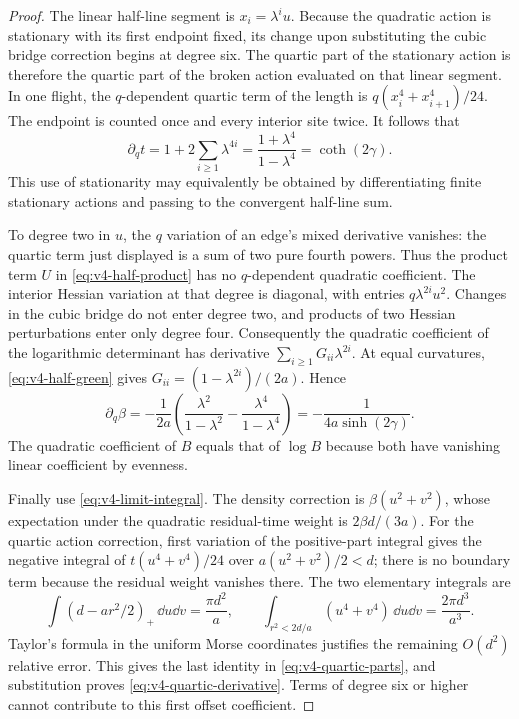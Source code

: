 \begin{proof}
The linear half-line segment is $x_i=\lambda^i u$. Because the
quadratic action is stationary with its first endpoint fixed, its
change upon substituting the cubic bridge correction begins at degree
six. The quartic part of the stationary action is therefore the
quartic part of the broken action evaluated on that linear segment.
In one flight, the $q$-dependent quartic term of the length is
$q(x_i^4+x_{i+1}^4)/24$. The endpoint is counted once and every
interior site twice. It follows that
\[
 \partial_qt=1+2\sum_{i\ge1}\lambda^{4i}
                  =\frac{1+\lambda^4}{1-\lambda^4}=\coth(2\gamma).
\]
This use of stationarity may equivalently be obtained by differentiating
finite stationary actions and passing to the convergent half-line sum.

To degree two in $u$, the $q$ variation of an edge's mixed derivative
vanishes: the quartic term just displayed is a sum of two pure fourth
powers. Thus the product term $U$ in \eqref{eq:v4-half-product} has
no $q$-dependent quadratic coefficient. The interior Hessian variation
at that degree is diagonal, with entries $q\lambda^{2i}u^2$.
Changes in the cubic bridge do not enter degree two, and products of
two Hessian perturbations enter only degree four. Consequently the
quadratic coefficient of the logarithmic determinant has derivative
$\sum_{i\ge1}G_{ii}\lambda^{2i}$. At equal curvatures,
\eqref{eq:v4-half-green} gives
$G_{ii}=(1-\lambda^{2i})/(2a)$. Hence
\[
 \partial_q\beta=-\frac1{2a}
 \left(\frac{\lambda^2}{1-\lambda^2}
              -\frac{\lambda^4}{1-\lambda^4}\right)
             =-\frac1{4a\sinh(2\gamma)}.
\]
The quadratic coefficient of $B$ equals that of $\log B$ because
both have vanishing linear coefficient by evenness.

Finally use \eqref{eq:v4-limit-integral}. The density correction is
$\beta(u^2+v^2)$, whose expectation under the quadratic residual-time
weight is $2\beta d/(3a)$. For the quartic action correction,
first variation of the positive-part integral gives the negative
integral of $t(u^4+v^4)/24$ over $a(u^2+v^2)/2<d$; there is no
boundary term because the residual weight vanishes there. The two
elementary integrals are
\[
 \int(d-ar^2/2)_+\,\dd u\dd v=\frac{\pi d^2}a,
 \qquad
 \int_{r^2<2d/a}(u^4+v^4)\,\dd u\dd v
                                  =\frac{2\pi d^3}{a^3}.
\]
Taylor's formula in the uniform Morse coordinates justifies the
remaining $O(d^2)$ relative error. This gives the last identity in
\eqref{eq:v4-quartic-parts}, and substitution proves
\eqref{eq:v4-quartic-derivative}. Terms of degree six or higher cannot
contribute to this first offset coefficient.
\end{proof}

